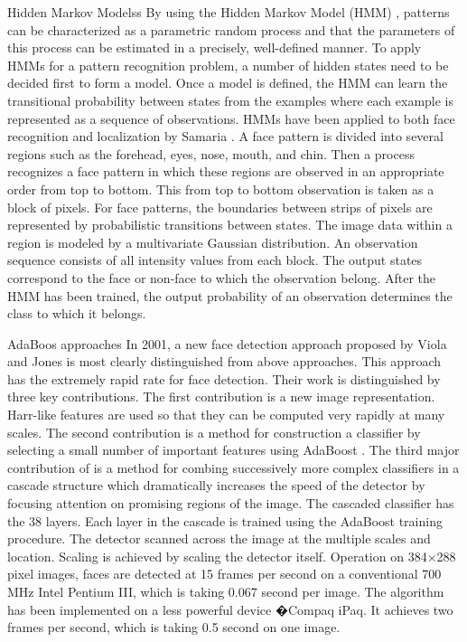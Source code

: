Hidden Markov Modelss
By using the Hidden Markov Model (HMM) \cite{}, patterns can be characterized as a parametric random process and that the parameters of this process can be estimated in a precisely, well-defined manner. To apply HMMs for a pattern recognition problem, a number of hidden states need to be decided first to form a model. Once a model is defined, the HMM can learn the transitional probability between states from the examples where each example is represented as a sequence of observations. HMMs have been applied to both face recognition and localization by Samaria \cite{}. A face pattern is divided into several regions such as the forehead, eyes, nose, mouth, and chin. Then a process recognizes a face pattern in which these regions are observed in an appropriate order from top to bottom. This from top to bottom observation is taken as a block of pixels. For face patterns, the boundaries between strips of pixels are represented by probabilistic transitions between states. The image data within a region is modeled by a multivariate Gaussian distribution. An observation sequence consists of all intensity values from each block. The output states correspond to the face or non-face to which the observation belong. After the HMM has been trained, the output probability of an observation determines the class to which it belongs. 

AdaBoos approaches
In 2001, a new face detection approach proposed by Viola and Jones \cite{} is most clearly distinguished from above approaches. This approach has the extremely rapid rate for face detection. Their work is distinguished by three key contributions. The first contribution is a new image representation. Harr-like features are used so that they can be computed very rapidly at many scales. The second contribution is a method for construction a classifier by selecting a small number of important features using AdaBoost \cite{}. The third major contribution of is a method for combing successively more complex classifiers in a cascade structure which dramatically increases the speed of the detector by focusing attention on promising regions of the image. The cascaded classifier has the 38 layers. Each layer in the cascade is trained using the AdaBoost training procedure. The detector scanned across the image at the multiple scales and location. Scaling is achieved by scaling the detector itself. Operation on 384×288 pixel images, faces are detected at 15 frames per second on a conventional 700 MHz Intel Pentium III, which is taking 0.067 second per image. The algorithm has been implemented on a less powerful device �Compaq iPaq. It achieves two frames per second, which is taking 0.5 second on one image.

